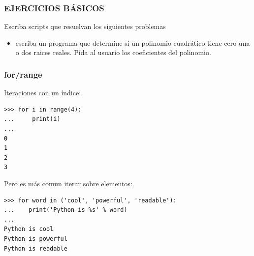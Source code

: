 \documentclass[10pt,colorlinks]{beamer}
\begin{document}
\begin{frame}[fragile]\frametitle{EJERCICIOS BÁSICOS}
\begin{block}{Escriba scripts que resuelvan los siguientes problemas}
\begin{itemize}
    \item escriba un programa que determine si un polinomio cuadrático tiene cero una o dos raices reales. Pida al usuario los coeficientes del polinomio.
\end{itemize}

\end{block}


\end{frame}



\begin{frame}[fragile]\frametitle{for/range}
  \begin{block}{Iteraciones con un índice:}
\tiny
\begin{verbatim}
>>> for i in range(4):
...     print(i)
... 
0
1
2
3
\end{verbatim}

  \end{block}
\begin{block}{Pero es más comun iterar sobre elementos:}
\tiny
\begin{verbatim}
>>> for word in ('cool', 'powerful', 'readable'):
...    print('Python is %s' % word)
... 
Python is cool
Python is powerful
Python is readable
\end{verbatim}

\end{block}
\end{frame}
\end{document}
